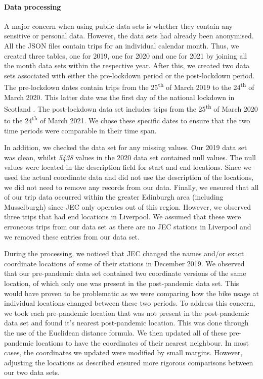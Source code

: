 \documentclass[11pt,a4paper]{article}
\begin{document}
\paragraph{Data processing} A major concern when using public data sets is whether they contain any sensitive or personal data. However, the data sets had already been anonymised. All the JSON files contain trips for an individual calendar month. Thus, we created three tables, one for 2019, one for 2020 and one for 2021 by joining all the month data sets within the respective year. After this, we created two data sets associated with either the pre-lockdown period or the post-lockdown period. The pre-lockdown dates contain trips from the 25\textsuperscript{th} of March 2019 to the 24\textsuperscript{th} of March 2020. This latter date was the first day of the national lockdown in Scotland \cite{timeline}. The post-lockdown data set includes trips from the 25\textsuperscript{th} of March 2020 to the 24\textsuperscript{th} of March 2021. We chose these specific dates to ensure that the two time periods were comparable in their time span. 
\par In addition, we checked the data set for any missing values. Our 2019 data set was clean, whilst \emph{5438} values in the 2020 data set contained null values. The null values were located in the description field for start and end locations. Since we used the actual coordinate data and did not use the description of the locations, we did not need to remove any records from our data. Finally, we ensured that all of our trip data occurred within the greater Edinburgh area (including Musselburgh) since JEC only operates out of this region. However, we observed three trips that had end locations in Liverpool. We assumed that these were erroneous trips from our data set as there are no JEC stations in Liverpool and we removed these entries from our data set.
\par During the processing, we noticed that JEC changed the names and/or exact coordinate locations of some of their stations in December 2019. We observed that our pre-pandemic data set contained two coordinate versions of the same location, of which only one was present in the post-pandemic data set. This would have proven to be problematic as we were comparing how the bike usage at individual locations changed between these two periods. To address this concern, we took each pre-pandemic location that was not present in the post-pandemic data set and found it's nearest post-pandemic location. This was done through the use of the Euclidean distance formula. We then updated all of these pre-pandemic locations to have the coordinates of their nearest neighbour. In most cases, the coordinates we updated were modified by small margins. However, adjusting the locations as described ensured more rigorous comparisons between our two data sets.  
\end{document}
